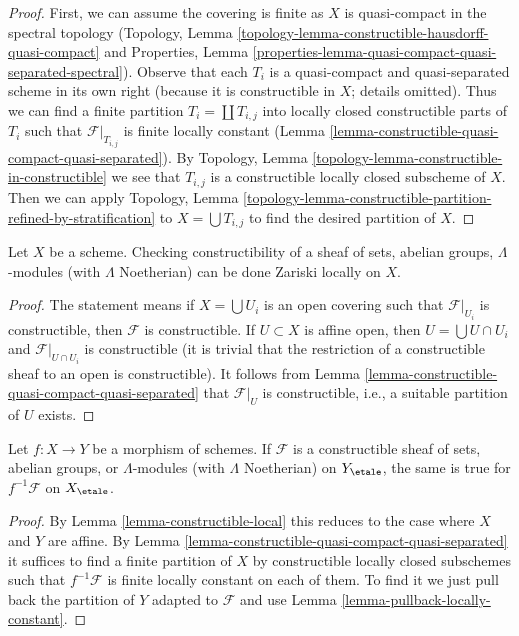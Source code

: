 \begin{proof}
First, we can assume the covering is finite as $X$ is quasi-compact
in the spectral topology
(Topology, Lemma \ref{topology-lemma-constructible-hausdorff-quasi-compact}
and
Properties, Lemma
\ref{properties-lemma-quasi-compact-quasi-separated-spectral}).
Observe that each $T_i$ is a quasi-compact and quasi-separated
scheme in its own right (because it is constructible in $X$; details omitted).
Thus we can find a finite partition $T_i = \coprod T_{i, j}$ into
locally closed constructible parts of $T_i$ such that
$\mathcal{F}|_{T_{i, j}}$ is finite locally constant
(Lemma \ref{lemma-constructible-quasi-compact-quasi-separated}).
By Topology, Lemma \ref{topology-lemma-constructible-in-constructible}
we see that $T_{i, j}$ is a constructible locally closed subscheme of $X$.
Then we can apply Topology, Lemma
\ref{topology-lemma-constructible-partition-refined-by-stratification}
to $X = \bigcup T_{i, j}$ to find the desired partition of $X$.
\end{proof}

\begin{lemma}
\label{lemma-constructible-local}
Let $X$ be a scheme. Checking constructibility of a sheaf
of sets, abelian groups, $\Lambda$-modules (with $\Lambda$ Noetherian)
can be done Zariski locally on $X$.
\end{lemma}

\begin{proof}
The statement means if $X = \bigcup U_i$ is an open covering
such that $\mathcal{F}|_{U_i}$ is constructible, then $\mathcal{F}$
is constructible. If $U \subset X$ is affine open, then
$U = \bigcup U \cap U_i$ and $\mathcal{F}|_{U \cap U_i}$ is constructible
(it is trivial that the restriction of a constructible sheaf to
an open is constructible). It follows from
Lemma \ref{lemma-constructible-quasi-compact-quasi-separated}
that $\mathcal{F}|_U$ is constructible, i.e., a suitable partition
of $U$ exists.
\end{proof}

\begin{lemma}
\label{lemma-pullback-constructible}
Let $f : X \to Y$ be a morphism of schemes. If $\mathcal{F}$ is a
constructible sheaf of sets, abelian groups, or $\Lambda$-modules
(with $\Lambda$ Noetherian) on $Y_\etale$, the same
is true for $f^{-1}\mathcal{F}$ on $X_\etale$.
\end{lemma}

\begin{proof}
By Lemma \ref{lemma-constructible-local} this reduces to the case
where $X$ and $Y$ are affine. By
Lemma \ref{lemma-constructible-quasi-compact-quasi-separated}
it suffices to find a finite partition of $X$ by constructible
locally closed subschemes such that $f^{-1}\mathcal{F}$ is finite locally
constant on each of them.
To find it we just pull back the partition of $Y$ adapted to
$\mathcal{F}$ and use
Lemma \ref{lemma-pullback-locally-constant}.
\end{proof}

